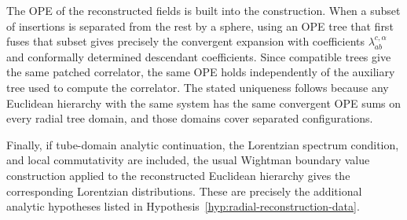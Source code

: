 The OPE of the reconstructed fields is built into the construction.  When a
subset of insertions is separated from the rest by a sphere, using an OPE
tree that first fuses that subset gives precisely the convergent expansion
with coefficients \(\lambda_{ab}^{c,\alpha}\) and conformally determined
descendant coefficients.  Since compatible trees give the same patched
correlator, the same OPE holds independently of the auxiliary tree used to
compute the correlator.  The stated uniqueness follows because any Euclidean
hierarchy with the same system has the same convergent OPE sums on every
radial tree domain, and those domains cover separated configurations.

Finally, if tube-domain analytic continuation, the Lorentzian spectrum
condition, and local commutativity are included, the usual Wightman boundary
value construction applied to the reconstructed Euclidean hierarchy gives the
corresponding Lorentzian distributions.  These are precisely the additional
analytic hypotheses listed in
Hypothesis~\ref{hyp:radial-reconstruction-data}.

